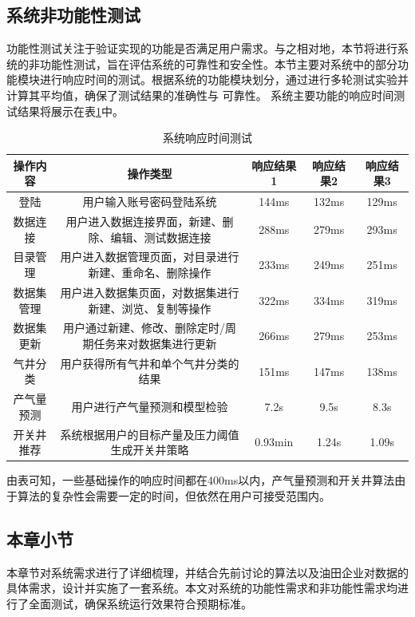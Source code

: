 \subsection{系统非功能性测试}
功能性测试关注于验证实现的功能是否满足用户需求。与之相对地，本节将进行系统的非功能性测试，旨在评估系统的可靠性和安全性。本节主要对系统中的部分功能模块进行响应时间的测试。根据系统的功能模块划分，通过进行多轮测试实验并计算其平均值，确保了测试结果的准确性与
可靠性。
系统主要功能的响应时间测试结果将展示在表\ref{tab:timte}中。
\begin{table}[H]
    \renewcommand{\arraystretch}{1.5}
    \centering
    \caption{系统响应时间测试}
    \label{tab:timte}
    \begin{tabular}{|c|c|c|c|c|}
        \hline
       操作内容& 操作类型 & 响应结果1 & 响应结果2 & 响应结果3 \\
       \hline
       登陆 & 用户输入账号密码登陆系统 & 144ms & 132ms & 129ms \\
       \hline
       数据连接 & 用户进入数据连接界面，新建、删除、编辑、测试数据连接 & 288ms & 279ms &293ms \\
       \hline
       目录管理 & 用户进入数据管理页面，对目录进行新建、重命名、删除操作 & 233ms & 249ms & 251ms \\
       \hline
       数据集管理 & 用户进入数据集页面，对数据集进行新建、浏览、复制等操作 & 322ms & 334ms & 319ms \\
       \hline
       数据集更新 & 用户通过新建、修改、删除定时/周期任务来对数据集进行更新 & 266ms &279ms &253ms \\
        \hline
        气井分类 & 用户获得所有气井和单个气井分类的结果 & 151ms & 147ms & 138ms\\ 
        \hline 
        产气量预测 & 用户进行产气量预测和模型检验 & 7.2s & 9.5s & 8.3s \\
        \hline
        开关井推荐 & 系统根据用户的目标产量及压力阈值生成开关井策略 & 0.93min & 1.24s & 1.09s \\
        \hline
    \end{tabular}
\end{table}
由表可知，一些基础操作的响应时间都在400ms以内，产气量预测和开关井算法由于算法的复杂性会需要一定的时间，但依然在用户可接受范围内。
\subsection{本章小节}
本章节对系统需求进行了详细梳理，并结合先前讨论的算法以及油田企业对数据的具体需求，设计并实施了一套系统。本文对系统的功能性需求和非功能性需求均进行了全面测试，确保系统运行效果符合预期标准。




